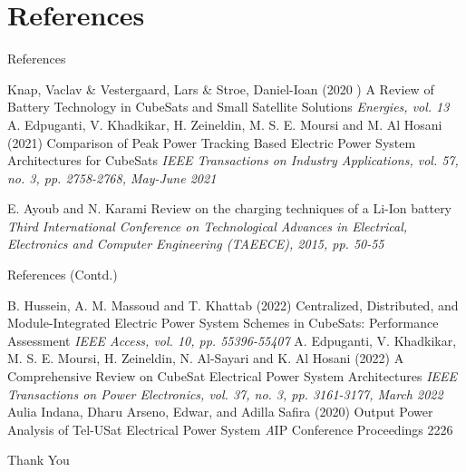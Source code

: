\documentclass[aspectratio=169]{beamer}
\begin{document}
	
	\section{References}
	\begin{frame}{References}
	
	\begin{thebibliography}{9}
			
		Knap, Vaclav \& Vestergaard, Lars \& Stroe, Daniel-Ioan (2020	)
		\newblock A Review of Battery Technology in CubeSats
		and Small Satellite Solutions
		\newblock \emph{Energies, vol. 13}	
			A. Edpuganti, V. Khadkikar, H. Zeineldin, M. S. E. Moursi and M. Al Hosani (2021)
			\newblock Comparison of Peak Power Tracking Based Electric Power System Architectures for CubeSats
			\newblock \emph{IEEE Transactions on Industry Applications, vol. 57, no. 3, pp. 2758-2768, May-June 2021}
			
		E. Ayoub and N. Karami 
		\newblock Review on the charging techniques of a Li-Ion battery
		\newblock \emph{Third International Conference on Technological Advances in Electrical, Electronics and Computer Engineering (TAEECE), 2015, pp. 50-55}
		\end{thebibliography}
	\end{frame}
	\begin{frame}{References (Contd.)}
	
	\begin{thebibliography}{9}
		
	B. Hussein, A. M. Massoud and T. Khattab (2022)
	\newblock Centralized, Distributed, and Module-Integrated Electric Power System Schemes in CubeSats: Performance Assessment
	\newblock \emph{ IEEE Access, vol. 10, pp. 55396-55407}
           A. Edpuganti, V. Khadkikar, M. S. E. Moursi, H. Zeineldin, N. Al-Sayari and K. Al Hosani (2022)
           \newblock A Comprehensive Review on CubeSat Electrical Power System Architectures
           \newblock \emph { IEEE Transactions on Power Electronics, vol. 37, no. 3, pp. 3161-3177, March 2022}
           Aulia Indana, Dharu Arseno, Edwar, and Adilla Safira (2020)
           \newblock Output Power Analysis of Tel-USat Electrical Power System 
           \newblock \emph  AIP Conference Proceedings 2226
        

	
	






	\end{thebibliography}
	\end{frame}
	
	\begin{frame}
	\huge \center Thank You
		
	\end{frame}
\end{document}
